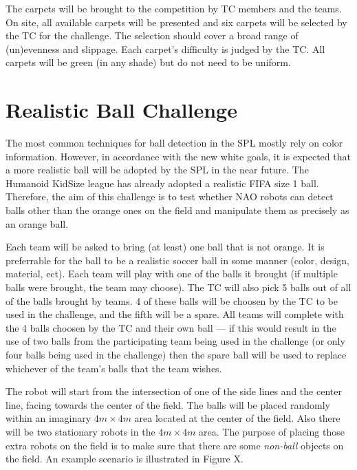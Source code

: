 \documentclass[12pt]{article}
\begin{document}
The carpets will be brought to the competition by TC members and the teams. On site, all available carpets will be presented and six carpets will be selected by the TC for the challenge. The selection should cover a broad range of (un)evenness and slippage. Each carpet's difficulty is judged by the TC. All carpets will be green (in any shade) but do not need to be uniform.


\newpage






\section{Realistic Ball Challenge}

The most common techniques for ball detection in the SPL mostly rely on color information. However, in accordance with the new white goals, it is expected that a more realistic ball will be adopted by the SPL in the near future.  The Humanoid KidSize league has already adopted a realistic FIFA size 1 ball.  Therefore, the aim of this challenge is to test whether NAO robots can detect balls other than the orange ones on the field and manipulate them as precisely as an orange ball.

Each team will be asked to bring (at least) one ball that is not orange.  It is preferrable for the ball to be a realistic soccer ball in some manner (color, design, material, ect). Each team will play with one of the balls it brought (if multiple balls were brought, the team may choose).  The TC will also pick 5 balls out of all of the balls brought by teams.  4 of these balls will be choosen by the TC to be used in the challenge, and the fifth will be a spare.  All teams will complete with the 4 balls choosen by the TC and their own ball --- if this would result in the use of two balls from the participating team being used in the challenge (or only four balls being used in the challenge) then the spare ball will be used to replace whichever of the team's balls that the team wishes.

The robot will start from the intersection of one of the side lines and the center line, facing towards the center of the field. The balls will be placed randomly within an imaginary $4m \times 4m$ area located at the center of the field. Also there will be two stationary robots in the  $4m \times 4m$ area. The purpose of placing those extra robots on the field is to make sure that there are some \emph{non-ball} objects on the field. An example scenario is illustrated in Figure X.
\end{document}

